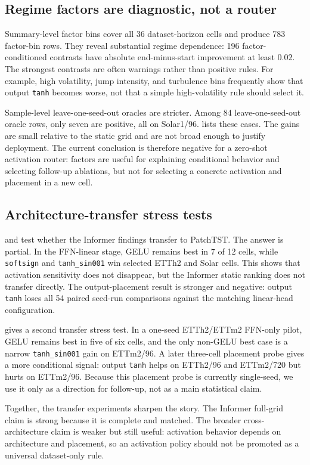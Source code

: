 \subsection{Regime factors are diagnostic, not a router}

Summary-level factor bins cover all 36 dataset-horizon cells and produce 783 factor-bin rows. They reveal substantial regime dependence: 196 factor-conditioned contrasts have absolute end-minus-start improvement at least \(0.02\). The strongest contrasts are often warnings rather than positive rules. For example, high volatility, jump intensity, and turbulence bins frequently show that output \texttt{tanh} becomes worse, not that a simple high-volatility rule should select it.

Sample-level leave-one-seed-out oracles are stricter. Among 84 leave-one-seed-out oracle rows, only seven are positive, all on Solar1/96.  lists these cases. The gains are small relative to the static grid and are not broad enough to justify deployment. The current conclusion is therefore negative for a zero-shot activation router: factors are useful for explaining conditional behavior and selecting follow-up ablations, but not for selecting a concrete activation and placement in a new cell.



\subsection{Architecture-transfer stress tests}

 and  test whether the Informer findings transfer to PatchTST. The answer is partial. In the FFN-linear stage, GELU remains best in 7 of 12 cells, while \texttt{softsign} and \texttt{tanh\_sin001} win selected ETTh2 and Solar cells. This shows that activation sensitivity does not disappear, but the Informer static ranking does not transfer directly. The output-placement result is stronger and negative: output \texttt{tanh} loses all 54 paired seed-run comparisons against the matching linear-head configuration.




 gives a second transfer stress test. In a one-seed ETTh2/ETTm2 FFN-only pilot, GELU remains best in five of six cells, and the only non-GELU best case is a narrow \texttt{tanh\_sin001} gain on ETTm2/96. A later three-cell placement probe gives a more conditional signal: output \texttt{tanh} helps on ETTh2/96 and ETTm2/720 but hurts on ETTm2/96. Because this placement probe is currently single-seed, we use it only as a direction for follow-up, not as a main statistical claim.



Together, the transfer experiments sharpen the story. The Informer full-grid claim is strong because it is complete and matched. The broader cross-architecture claim is weaker but still useful: activation behavior depends on architecture and placement, so an activation policy should not be promoted as a universal dataset-only rule.
